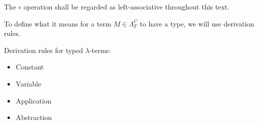 \documentclass[main.tex]{subfiles}
\begin{document}
The $\circ$ operation shall be regarded as left-associative throughout this
text.

To define what it means for a term $M \in \Lambda_T^C$ to have a type,
we will use derivation rules.
\begin{defn}
    \label{def:termderiv}
    Derivation rules for typed $\lambda$-terms:
    \begin{itemize}
        \item Constant
        \item Variable
        \item Application
        \item Abstraction
    \end{itemize}
\end{defn}
\end{document}
